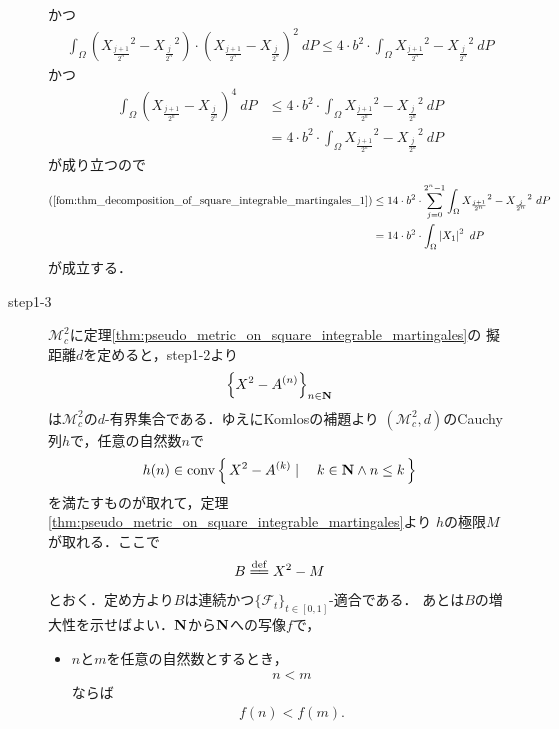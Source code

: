 \begin{sketch}
\begin{description}
				かつ
				\begin{align}
					\int_\Omega \left( {X_{\frac{j+1}{2^n}}}^{2} - {X_{\frac{j}{2^n}}}^{2} \right) \cdot \left(X_{\frac{j+1}{2^n}} - X_{\frac{j}{2^n}}\right)^{2}\ dP
					\leq 4 \cdot b^{2} \cdot \int_\Omega {X_{\frac{j+1}{2^n}}}^{2} - {X_{\frac{j}{2^n}}}^{2}\ dP
				\end{align}
				かつ
				\begin{align}
					\int_\Omega \left(X_{\frac{j+1}{2^n}} - X_{\frac{j}{2^n}}\right)^{4}\ dP
					&\leq 4 \cdot b^{2} \cdot \int_\Omega {X_{\frac{j+1}{2^n}}}^{2} - {X_{\frac{j}{2^n}}}^{2}\ dP \\
					&= 4 \cdot b^{2} \cdot \int_\Omega {X_{\frac{j+1}{2^n}}}^{2} - {X_{\frac{j}{2^n}}}^{2}\ dP
				\end{align}
				が成り立つので
				\begin{align}
					(\refeq{fom:thm_decomposition_of_square_integrable_martingales_1})
					&\leq 14 \cdot b^{2} \cdot \sum_{j=0}^{2^n-1} \int_\Omega {X_{\frac{j+1}{2^n}}}^{2} - {X_{\frac{j}{2^n}}}^{2}\ dP \\
					&= 14 \cdot b^{2} \cdot \int_\Omega \left|X_{1}\right|^{2}\ dP
				\end{align}
				が成立する．
				
			\item[step1-3]
				$\mathscr{M}_{c}^{2}$に定理\ref{thm:pseudo_metric_on_square_integrable_martingales}の
				擬距離$d$を定めると，step1-2より
				\begin{align}
					\left\{X^{2} - A^{(n)}\right\}_{n \in \mathbf{N}}
				\end{align}
				は$\mathscr{M}_{c}^{2}$の$d$-有界集合である．ゆえにKomlosの補題より
				$\left(\mathscr{M}_{c}^{2},d\right)$のCauchy列$h$で，任意の自然数$n$で
				\begin{align}
					h(n) \in \operatorname*{conv} \left\{\, X^{2}-A^{(k)} \mid \quad k \in \mathbf{N} \wedge n \leq k\, \right\}
					\label{fom:thm_decomposition_of_square_integrable_martingales_5}
				\end{align}
				を満たすものが取れて，定理\ref{thm:pseudo_metric_on_square_integrable_martingales}より
				$h$の極限$M$が取れる．ここで
				\begin{align}
					B \defeq X^{2} - M
				\end{align}
				とおく．定め方より$B$は連続かつ$\{\mathscr{F}_t\}_{t \in [0,1]}$-適合である．
				あとは$B$の増大性を示せばよい．$\mathbf{N}$から$\mathbf{N}$への写像$f$で，
				\begin{itemize}
					\item $n$と$m$を任意の自然数とするとき，
						\begin{align}
							n < m
						\end{align}
						ならば
						\begin{align}
							f(n) < f(m).
						\end{align}
						

\end{itemize}
\end{description}
\end{sketch}
